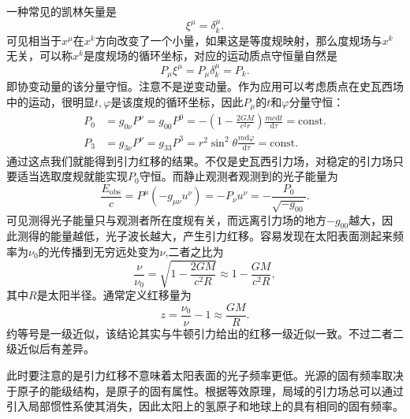 \documentclass[11pt, a4paper, oneside, onecolumn]{ctexart}
\numberwithin{equation}{subsection}
\begin{document}
一种常见的凯林矢量是
\begin{equation}
\xi^{\mu}=\delta{}^{\mu}_{k}.
\end{equation}
可见相当于$x^{\mu}$在$x^{k}$方向改变了一个小量，如果这是等度规映射，那么度规场与$x^{k}$无关，可以称$x^{k}$是度规场的循环坐标，对应的运动质点守恒量自然是
\begin{equation}
P_{\mu}\xi^{\mu}=P_{\mu}\delta{}^{\mu}_{k}=P_{k}.
\end{equation}
即协变动量的该分量守恒。注意不是逆变动量。作为应用可以考虑质点在史瓦西场中的运动，很明显$t,\varphi$是该度规的循环坐标，因此$P_{\mu}$的$t$和$\varphi$分量守恒：
\begin{align}
P_{0}&=g_{0\nu}P^{\nu}=g_{00}P^{0}=-\left(1-\frac{2GM}{c^{2}r}\right)\frac{mc\mathrm{d}t}{\mathrm{d}\tau}=\text{const}.\\
P_{3}&=g_{3\nu}P^{\nu}=g_{33}P^{3}=r^{2}\sin^{2}\theta\frac{m\mathrm{d}\varphi}{\mathrm{d}\tau}=\text{const}.
\end{align}
通过这点我们就能得到引力红移的结果。不仅是史瓦西引力场，对稳定的引力场只要适当选取度规就能实现$P_{0}$守恒。而静止观测者观测到的光子能量为
\begin{equation}
\frac{E_{\text{obs}}}{c}=P^{\mu}\left(-g_{\mu\nu}u^{\nu}\right)=-P_{\nu}u^{\nu}=-\frac{P_{0}}{\sqrt{-g_{00}}}.
\end{equation}
可见测得光子能量只与观测者所在度规有关，而远离引力场的地方$-g_{00}$越大，因此测得的能量越低，光子波长越大，产生引力红移。容易发现在太阳表面测起来频率为$\nu_{0}$的光传播到无穷远处变为$\nu$,二者之比为
\begin{equation}
\frac{\nu}{\nu_{0}}=\sqrt{1-\frac{2GM}{c^{2}R}}\approx1-\frac{GM}{c^{2}R},
\end{equation}
其中$R$是太阳半径。通常定义红移量为
\begin{equation}
z=\frac{\nu_{0}}{\nu}-1\approx\frac{GM}{R}.
\end{equation}
约等号是一级近似，该结论其实与牛顿引力给出的红移一级近似一致。不过二者二级近似后有差异。

此时要注意的是引力红移不意味着太阳表面的光子频率更低。光源的固有频率取决于原子的能级结构，是原子的固有属性。根据等效原理，局域的引力场总可以通过引入局部惯性系使其消失，因此太阳上的氢原子和地球上的具有相同的固有频率。
\end{document}
